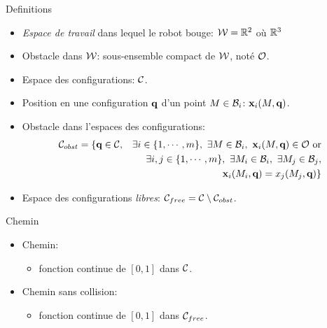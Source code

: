 %
%

\begin{frame} {Definitions}

\begin{itemize}
  \item \emph{Espace de travail} dans lequel le robot bouge: ${\cal W}=\mathbb{R}^2$ o\`u $\mathbb{R}^3$
    \pause
  \item Obstacle dans ${\cal W}$: sous-ensemble compact de ${\cal W}$, not\'e ${\cal O}$.
    \pause
  \item Espace des configurations: ${\cal C}$.
    \pause
  \item Position en une configuration $\textbf{q}$ d'un point $M\in{\cal B}_i$:
    $\textbf{x}_i(M,\textbf{q})$.
    \pause
  \item Obstacle dans l'espaces des configurations:
    \begin{eqnarray*}
      \CSobst&=\{\conf\in\CS,&\exists i\in\{1,\cdots,m\},\ \exists M\in\body_i,\ \x_i(M,\conf)\in\obst\ \mbox{or}\\
      &&\exists i,j\in\{1,\cdots,m\},\ \exists M_i\in\body_i,\ \exists M_j\in\body_j,\\
    &&\x_i(M_i,\conf)=x_j(M_j,\conf)\}
  \end{eqnarray*}
  \pause
\item Espace des configurations \emph{libres}: ${\cal C}_{free} = {\cal C}\setminus{\cal C}_{obst}$.
\end{itemize}
\end{frame}

%
%

\begin{frame} {Chemin}
  \begin{itemize}
    \item Chemin:
      \begin{itemize}
        \item fonction continue de $[0,1]$ dans ${\cal C}$.
      \end{itemize}
      \pause
    \item Chemin sans collision:
      \begin{itemize}
        \item fonction continue de $[0,1]$ dans ${\cal C}_{free}$.
      \end{itemize}
  \end{itemize}
\end{frame}

%
%

